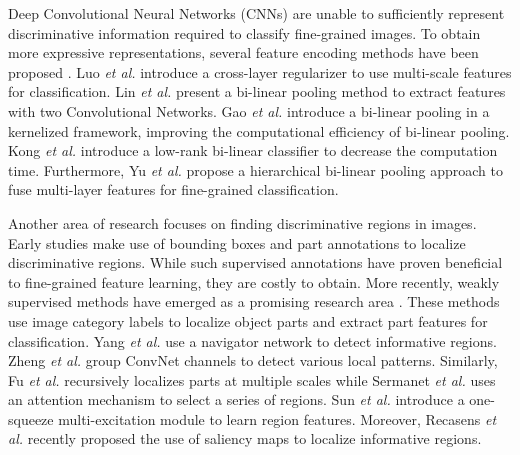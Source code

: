 \documentclass[journal]{IEEEtran}
\begin{document}
Deep Convolutional Neural Networks (CNNs) \cite{SimonyanZ14a,he2016deep,szegedy2015going} are unable to sufficiently represent discriminative information required to classify fine-grained images. To obtain more expressive representations, several feature encoding methods have been proposed \cite{lin2015bilinear,gao2016compact,kong2017low,yu2018hierarchical,luo2019cross,chang2020devil}. Luo \emph{et al.} \cite{luo2019cross} introduce a cross-layer regularizer to use multi-scale features for classification. Lin \emph{et al.} \cite{lin2015bilinear} present a bi-linear pooling method to extract features with two Convolutional Networks. Gao \emph{et al.} \cite{gao2016compact} introduce a bi-linear pooling in a kernelized framework, improving the computational efficiency of bi-linear pooling.
Kong \emph{et al.} \cite{kong2017low} introduce a low-rank bi-linear classifier to decrease the computation time. 
Furthermore, Yu \emph{et al.} \cite{yu2018hierarchical} propose a hierarchical bi-linear pooling approach to fuse multi-layer features for fine-grained classification.

Another area of research focuses on finding discriminative regions in images. Early studies \cite{zhang2014part,lin2015deep,huang2016part,zhang2016spda,goring2014nonparametric,he2019and} make use of bounding boxes and part annotations to localize discriminative regions. While such supervised annotations have proven beneficial to fine-grained feature learning, they are costly to obtain.
More recently, weakly supervised methods have emerged as a promising research area \cite{peng2017object,zhang2016weakly,yang2018learning,zheng2017learning,fu2017look,sermanet2014attention,sun2018multi,recasens2018learning,wang2018learning}. These methods use image category labels to localize object parts and extract part features for classification.
Yang \emph{et al.} \cite{yang2018learning} use a navigator network to detect informative regions. Zheng \emph{et al.} \cite{zheng2017learning} group ConvNet channels to detect various local patterns. Similarly, Fu \emph{et al.} \cite{fu2017look} recursively localizes parts at multiple scales while Sermanet \emph{et al.} \cite{sermanet2014attention} uses an attention mechanism to select a series of regions. Sun \emph{et al.} \cite{sun2018multi} introduce a one-squeeze multi-excitation module to learn region features. 
Moreover, Recasens \emph{et al.} \cite{recasens2018learning} recently proposed the use of saliency maps to localize informative regions. 
\end{document}

